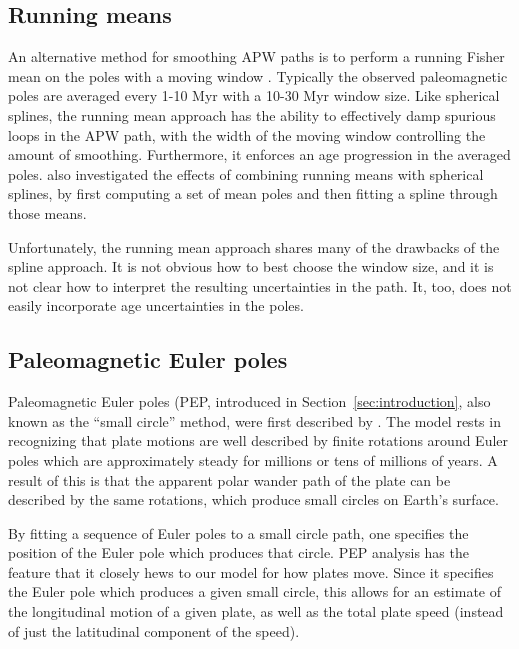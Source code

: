 \documentclass[preprint,12pt,authoryear]{elsarticle}
\begin{document}
\subsection{Running means}

An alternative method for smoothing APW paths is to perform a running Fisher
mean on the poles with a moving window \citep{van2001evidence, torsvik2008global}.
Typically the observed paleomagnetic poles are averaged every 1-10 Myr with a 10-30 Myr
window size. Like spherical splines, the running mean approach has the ability
to effectively damp spurious loops in the APW path, with the width
of the moving window controlling the amount of smoothing.
Furthermore, it enforces an age progression in the averaged poles.
\citet{torsvik2008global} also investigated the effects of combining running means
with spherical splines, by first computing a set of mean poles and then
fitting a spline through those means.

Unfortunately, the running mean approach shares many of the drawbacks of the spline approach. 
It is not obvious how to best choose the window size, 
and it is not clear how to interpret the resulting uncertainties in the path.
It, too, does not easily incorporate age uncertainties in the poles.

\subsection{Paleomagnetic Euler poles}

Paleomagnetic Euler poles (PEP, introduced in Section~\ref{sec:introduction}, 
also known as the ``small circle'' method, were first described by \citet{gordon1984paleomagnetic}.
The model rests in recognizing that plate motions are well described by finite
rotations around Euler poles which are approximately steady for millions or 
tens of millions of years. A result of this is that the apparent polar
wander path of the plate can be described by the same rotations, which
produce small circles on Earth's surface.

By fitting a sequence of Euler poles to a small circle path, one specifies
the position of the Euler pole which produces that circle.
PEP analysis has the feature that it closely hews to our model for how plates move.
Since it specifies the Euler pole which produces a given small circle,
this allows for an estimate of the longitudinal motion of a given plate, 
as well as the total plate speed (instead of just the latitudinal component of the speed).
\end{document}
